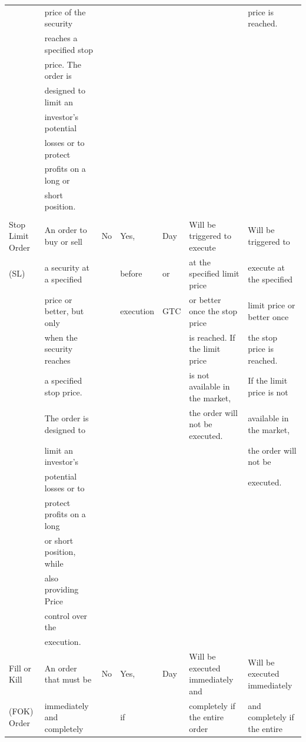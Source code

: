 \documentclass[11pt]{article}
\begin{document}
\begin{center}
\begin{tabular}{lllllll}
 & price of the security &  &  &  &  & price is reached.\\[0pt]
 & reaches a specified stop &  &  &  &  & \\[0pt]
 & price. The order is &  &  &  &  & \\[0pt]
 & designed to limit an &  &  &  &  & \\[0pt]
 & investor's potential &  &  &  &  & \\[0pt]
 & losses or to protect &  &  &  &  & \\[0pt]
 & profits on a long or &  &  &  &  & \\[0pt]
 & short position. &  &  &  &  & \\[0pt]
\hline
 &  &  &  &  &  & \\[0pt]
Stop Limit Order & An order to buy or sell & No & Yes, & Day & Will be triggered to execute & Will be triggered to\\[0pt]
(SL) & a security at a specified &  & before & or & at the specified limit price & execute at the specified\\[0pt]
 & price or better, but only &  & execution & GTC & or better once the stop price & limit price or better once\\[0pt]
 & when the security reaches &  &  &  & is reached. If the limit price & the stop price is reached.\\[0pt]
 & a specified stop price. &  &  &  & is not available in the market, & If the limit price is not\\[0pt]
 & The order is designed to &  &  &  & the order will not be executed. & available in the market,\\[0pt]
 & limit an investor's &  &  &  &  & the order will not be\\[0pt]
 & potential losses or to &  &  &  &  & executed.\\[0pt]
 & protect profits on a long &  &  &  &  & \\[0pt]
 & or short position, while &  &  &  &  & \\[0pt]
 & also providing Price &  &  &  &  & \\[0pt]
 & control over the &  &  &  &  & \\[0pt]
 & execution. &  &  &  &  & \\[0pt]
\hline
Fill or Kill & An order that must be & No & Yes, & Day & Will be executed immediately and & Will be executed immediately\\[0pt]
(FOK) Order & immediately and completely &  & if &  & completely if the entire order & and completely if the entire\\[0pt]

\end{tabular}
\end{center}
\end{document}
